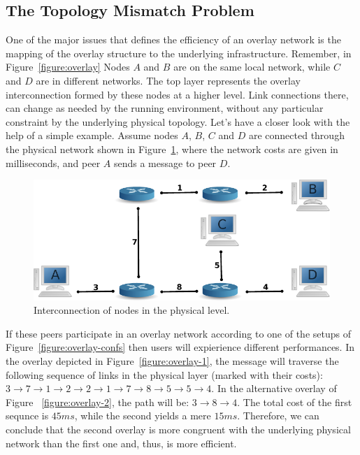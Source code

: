 \subsection{The Topology Mismatch Problem}

One of the major issues that defines the efficiency of an overlay network is the
mapping of the overlay structure to the underlying infrastructure. Remember, in
Figure~\ref{figure:overlay} Nodes $A$ and $B$ are on the same local network,
while $C$ and $D$ are in different networks. The top layer represents the
overlay interconnection formed by these nodes at a higher level. Link
connections there, can change as needed by the running environment, without any
particular constraint by the underlying physical topology. Let's have a closer
look with the help of a simple example. Assume nodes $A$, $B$, $C$ and $D$ are
connected through the physical network shown in Figure~\ref{figure:phys}, where
the network costs are given in milliseconds, and peer $A$ sends a message to
peer $D$.

\begin{figure}
\centering
  \includegraphics[scale=0.8]{img/phys.pdf}
\caption{Interconnection of nodes in the physical level.}
\label{figure:phys}
\end{figure}

If these peers participate in an overlay network according to one of the setups
of Figure~\ref{figure:overlay-confs} then users will expierience different
performances. In the overlay depicted in Figure~\ref{figure:overlay-1}, the
message will traverse the following sequence of links in the physical layer
(marked with their costs): $3 \rightarrow 7 \rightarrow 1 \rightarrow 2
\rightarrow 2 \rightarrow 1 \rightarrow 7 \rightarrow 8 \rightarrow 5
\rightarrow 5 \rightarrow 4$. In the alternative overlay of Figure
~\ref{figure:overlay-2}, the path will be: $3 \rightarrow 8 \rightarrow 4$. The
total cost of the first sequnce is $45 ms$, while the second yields a mere $15
ms$. Therefore, we can conclude that the second overlay is more congruent with
the underlying physical network than the first one and, thus, is more efficient.

